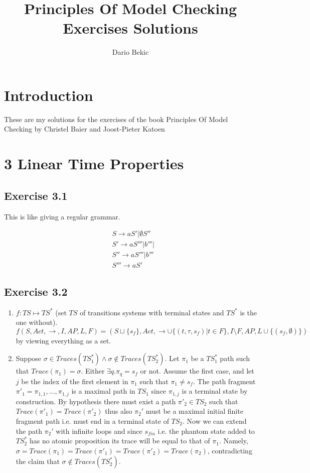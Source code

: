 \documentclass{article}
\title{Principles Of Model Checking Exercises Solutions}
\author{Dario Bekic}
\begin{document}
	
	\maketitle
	
	\section{Introduction}
	These are my solutions for the exercises of the book Principles Of Model Checking by Christel Baier and Joost-Pieter Katoen
	\section{3 Linear Time Properties}
	
	\subsection{Exercise 3.1}
	This is like giving a regular grammar.
	
	\begin{align*}
		&S \rightarrow aS' | \emptyset S''\\
		&S' \rightarrow aS'''|b'''|\\
		&S'' \rightarrow aS'''|b'''\\
		&S''' \rightarrow aS'
	\end{align*}
	
	\subsection*{Exercise 3.2}

	\begin{enumerate}[label=\alph*)]
		\item $f: TS \mapsto TS^*$ (set $TS$ of transitions systems with terminal states and $TS^*$ is the one without). $f(S, Act, \rightarrow, I, AP, L, F) = (S\sqcup \{s_f\}, Act, \rightarrow \cup \{ (t, \tau, s_f) | t \in F \}, I \setminus F, AP, L \cup \{(s_f, \emptyset)\})$ by viewing everything as a set.
		\item Suppose $\sigma \in Traces(TS^*_1) \land \sigma \notin Traces(TS^*_2)$. Let $\pi_1$ be a $TS_1^*$ path such that $Trace(\pi_1)=\sigma$. Either $\exists q. \pi_q=s_f$ or not. Assume the first case, and let $j$ be the index of the first element in $\pi_1$ such that $\pi_1 \neq s_f$. The path fragment $\pi'_1=\pi_{1,1},...,\pi_{1,j}$  is a maximal path in $TS_1$ since $\pi_{1,j}$ is a terminal state by construction. By hypothesis there must exist a path $\pi'_2 \in TS_2$ such that $Trace(\pi'_1)=Trace(\pi'_2)$ thus also $\pi_2'$ must be a maximal initial finite fragment path i.e. must end in a terminal state of $TS_2$. Now we can extend the path $\pi_2'$ with infinite loops and since $s_{fin}$ i.e. the phantom state added to $TS_2^*$ has no atomic proposition its trace will be equal to that of $\pi_1$. Namely, $\sigma= Trace(\pi_1)=Trace(\pi'_1)=Trace(\pi'_2)=Trace(\pi_2)$, contradicting the claim that $\sigma \notin Traces(TS_2^*)$.
	\end{enumerate}
	
\end{document}
